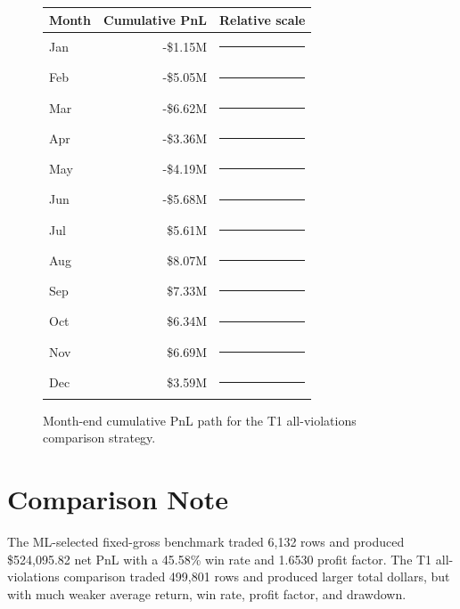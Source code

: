 \documentclass[11pt]{article}
\begin{document}
\begin{figure}[h]
\centering
\begin{tabular}{@{}lrl@{}}
\toprule
Month & Cumulative PnL & Relative scale \\
\midrule
Jan & -\$1.15M & \textcolor{red}{\rule{1.4cm}{7pt}}\\
Feb & -\$5.05M & \textcolor{red}{\rule{6.3cm}{7pt}}\\
Mar & -\$6.62M & \textcolor{red}{\rule{8.2cm}{7pt}}\\
Apr & -\$3.36M & \textcolor{red}{\rule{4.2cm}{7pt}}\\
May & -\$4.19M & \textcolor{red}{\rule{5.2cm}{7pt}}\\
Jun & -\$5.68M & \textcolor{red}{\rule{7.0cm}{7pt}}\\
Jul & \$5.61M & \textcolor{green!50!black}{\rule{6.9cm}{7pt}}\\
Aug & \$8.07M & \textcolor{green!50!black}{\rule{10.0cm}{7pt}}\\
Sep & \$7.33M & \textcolor{green!50!black}{\rule{9.1cm}{7pt}}\\
Oct & \$6.34M & \textcolor{green!50!black}{\rule{7.9cm}{7pt}}\\
Nov & \$6.69M & \textcolor{green!50!black}{\rule{8.3cm}{7pt}}\\
Dec & \$3.59M & \textcolor{green!50!black}{\rule{4.5cm}{7pt}}\\
\bottomrule
\end{tabular}
\caption{Month-end cumulative PnL path for the T1 all-violations comparison strategy.}
\end{figure}

\section{Comparison Note}

The ML-selected fixed-gross benchmark traded 6,132 rows and produced \$524,095.82 net PnL with a 45.58\% win rate and 1.6530 profit factor. The T1 all-violations comparison traded 499,801 rows and produced larger total dollars, but with much weaker average return, win rate, profit factor, and drawdown.
\end{document}
